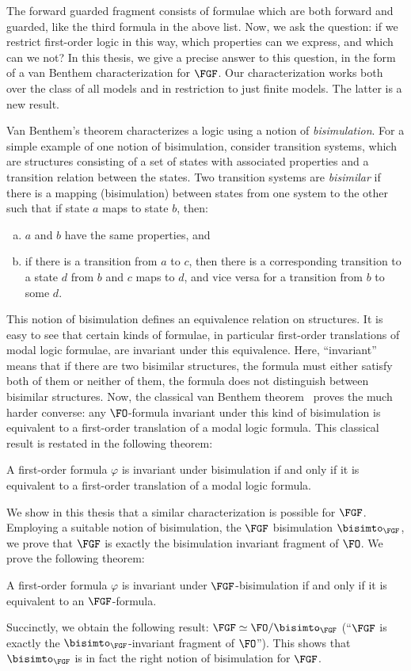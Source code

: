 The forward guarded fragment consists of formulae which are both forward and guarded, like the third formula in the above list.
Now, we ask the question: if we restrict first-order logic in this way, which properties can we express, and which can we not?
In this thesis, we give a precise answer to this question, in the form of a van Benthem characterization for $\FGF$.
Our characterization works both over the class of all models and in restriction to just finite models.
The latter is a new result.

Van Benthem's theorem characterizes a logic using a notion of \emph{bisimulation}.
For a simple example of one notion of bisimulation, consider transition systems, which are structures consisting of a set of states with associated properties and a transition relation between the states.
Two transition systems are \emph{bisimilar} if there is a mapping (bisimulation) between states from one system to the other such that if state $a$ maps to state $b$, then:
\begin{enumerate}[(a)]
  \item $a$ and $b$ have the same properties, and
  \item if there is a transition from $a$ to $c$, then there is a corresponding transition to a state $d$ from $b$ and $c$ maps to $d$, and vice versa for a transition from $b$ to some $d$.
\end{enumerate}
This notion of bisimulation defines an equivalence relation on structures.
It is easy to see that certain kinds of formulae, in particular first-order translations of modal logic formulae, are invariant under this equivalence.
Here, ``invariant'' means that if there are two bisimilar structures, the formula must either satisfy both of them or neither of them, \ie{} the formula does not distinguish between bisimilar structures.
Now, the classical van Benthem theorem~\cite{van1983modal} proves the much harder converse: any $\FO$-formula invariant under this kind of bisimulation is equivalent to a first-order translation of a modal logic formula.
This classical result is restated in the following theorem:
\begin{theorem}
  A first-order formula $\varphi$ is invariant under bisimulation if and only if it is equivalent to a first-order translation of a modal logic formula.
\end{theorem}

We show in this thesis that a similar characterization is possible for $\FGF$.
Employing a suitable notion of bisimulation, the $\FGF$ bisimulation $\bisimto_{\FGF}$, we prove that $\FGF$ is exactly the bisimulation invariant fragment of $\FO$.
We prove the following theorem:
\begin{theorem}\label{thm:invariance-iff-fgf}
  A first-order formula $\varphi$ is invariant under $\FGF$-bisimulation if and only if it is equivalent to an $\FGF$-formula.
\end{theorem}
Succinctly, we obtain the following result: $\FGF \simeq \FO/{\bisimto_{\FGF}}$ (``$\FGF$ is exactly the $\bisimto_{\FGF}$-invariant fragment of $\FO$'').
This shows that $\bisimto_{\FGF}$ is in fact the right notion of bisimulation for $\FGF$.

